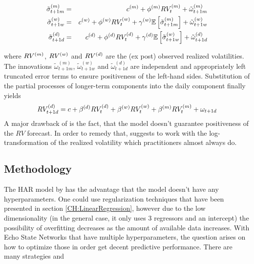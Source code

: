 \begin{eqnarray}
    \tilde \sigma_{t+1m}^{(m)} & = & c^{(m)} + \phi^{(m)}RV^{(m)}_t + \tilde \omega_{t+1m}^{(m)} \\
    \tilde \sigma_{t+1w}^{(w)} & = & c^{(w)} + \phi^{(w)}RV^{(w)}_t + \gamma^{(w)}\mathbb{E}\left[ \tilde \sigma_{t+1m}^{(m)} \right] + \tilde \omega_{t+1w}^{(w)} \\
    \tilde \sigma_{t+1d}^{(d)} & = & c^{(d)} + \phi^{(d)}RV^{(d)}_t + \gamma^{(d)}\mathbb{E}\left[ \tilde \sigma_{t+1w}^{(w)} \right] + \tilde \omega_{t+1d}^{(d)} \\
\end{eqnarray}

where $RV^{(m)}$, $RV^{(w)}$ and $RV^{(d)}$ are the (ex post) observed realized volatilities. The innovations $\tilde \omega_{t+1m}^{(m)}$, $\tilde \omega_{t+1w}^{(w)}$ and $\tilde \omega_{t+1d}^{(d)}$ are independent and appropriately left truncated error terms to ensure positiveness of the left-hand sides. Substitution of the partial processes of longer-term components into the daily component finally yields
\begin{equation}
    RV^{(d)}_{t+1d} = c + \beta^{(d)}RV^{(d)}_t + \beta^{(w)}RV^{(w)}_t + \beta^{(m)}RV^{(m)}_t + \omega_{t+1d} \label{EQ:HAR}
\end{equation}
A major drawback of  is the fact, that the model doesn't guarantee positiveness of the $RV$ forecast. In order to remedy that, \cite{Corsi2009} suggests to work with the log-transformation of the realized volatility which practitioners almost always do.

\subsection{Methodology}
\label{CH:Application:Methodology}

The HAR model by \cite{Corsi2009} has the advantage that the model doesn't have any hyperparameters. One could use regularization techniques that have been presented in section \ref{CH:LinearRegression}, however due to the low dimensionality (in the general case, it only uses $3$ regressors and an intercept) the possibility of overfitting decreases as the amount of available data increases. With Echo State Networks that have multiple hyperparameters, the question arises on how to optimize those in order get decent predictive performance. There are many strategies and 

